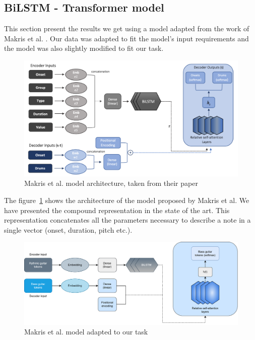 \subsection{BiLSTM - Transformer model}

This section present the results we get using a model adapted from the work of Makris et al. \cite{makris_conditional_2022}.
Our data was adapted to fit the model's input requirements and the model was also slightly modified to fit our task.

\begin{figure}[!ht]
    \centering
    \includegraphics[width=.75\linewidth]{../images-figures/makris_model.png}
    \caption{Makris et al. model architecture, taken from their paper \cite{makris_conditional_2022}}
    \label{fig:makris_model}
\end{figure}

The figure~\ref{fig:makris_model} shows the architecture of the model proposed by Makris et al.
We have presented the compound representation in the state of the art.
This representation concatenates all the parameters necessary to describe a note in a single vector (onset, duration, pitch etc.).

\begin{figure}[!ht]
    \centering
    \includegraphics[width=.75\linewidth]{../images-figures/model_adapted.png}
    \caption{Makris et al. model adapted to our task}
    \label{fig:makris_model_adapted}
\end{figure}

